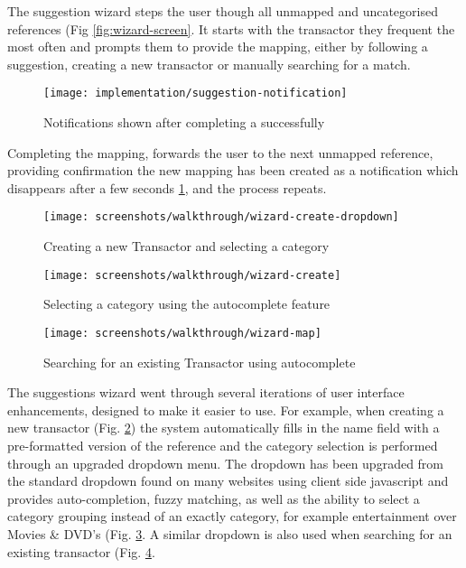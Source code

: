 The suggestion wizard steps the user though all unmapped and uncategorised references (Fig \ref{fig:wizard-screen}. It starts with the transactor they frequent the most often and prompts them to provide the mapping, either by following a suggestion, creating a new transactor or manually searching for a match.

\begin{figure}
\centering
\texttt{[image: implementation/suggestion-notification]}
\caption{Notifications shown after completing a successfully}
\label{fig:suggestion-complete-notification}
\end{figure}

Completing the mapping, forwards the user to the next unmapped reference, providing confirmation the new mapping has been created as a notification which disappears after a few seconds \ref{fig:suggestion-complete-notification}, and the process repeats.

\begin{figure}
\centering
\texttt{[image: screenshots/walkthrough/wizard-create-dropdown]}
\caption{Creating a new Transactor and selecting a category}
\label{fig:create-new-transactor}
\end{figure}

\begin{figure}
\centering
\texttt{[image: screenshots/walkthrough/wizard-create]}
\caption{Selecting a category using the autocomplete feature}
\label{fig:dropdown-autocomplete}
\end{figure}

\begin{figure}
\centering
\texttt{[image: screenshots/walkthrough/wizard-map]}
\caption{Searching for an existing Transactor using autocomplete}
\label{fig:wizard-map-dropdown}
\end{figure}

The suggestions wizard went through several iterations of user interface enhancements, designed to make it easier to use.
%
For example, when creating a new transactor (Fig. \ref{fig:create-new-transactor}) the system automatically fills in the name field with a pre-formatted version of the reference and the category selection is performed through an upgraded dropdown menu. The dropdown has been upgraded from the standard dropdown found on many websites using client side javascript and provides auto-completion, fuzzy matching, as well as the ability to select a category grouping instead of an exactly category, for example entertainment over Movies \& DVD's (Fig. \ref{fig:dropdown-autocomplete}. A similar dropdown is also used when searching for an existing transactor (Fig. \ref{fig:wizard-map-dropdown}.

